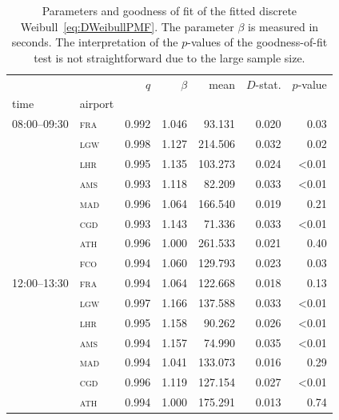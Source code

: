 \documentclass[draft,review]{elsarticle}
\newcommand{\airp}[1]{\textcolor{#1}{\textsc{#1}}}
\begin{document}
\begin{table}
    \centering
    \caption{Parameters and goodness of fit of the fitted discrete Weibull~\eqref{eq:DWeibullPMF}. The parameter \(\beta\) is measured in seconds. The interpretation of the \(p\)-values of the goodness-of-fit test is not straightforward due to the large sample size.}
    \label{tab:fitted}
    \begin{tabular}{llrrrrr}
      \toprule
                   &             &   \(q\) & \(\beta\) &    mean & \(D\)-stat. & \(p\)-value \\
      time & airport &       &         &         &           &           \\
      \midrule
      08:00--09:30 & \airp{fra} & 0.992 &   1.046 &  93.131 &     0.020 &      0.03 \\
                   & \airp{lgw} & 0.998 &   1.127 & 214.506 &     0.032 &      0.02 \\
                   & \airp{lhr} & 0.995 &   1.135 & 103.273 &     0.024 &     <0.01 \\
                   & \airp{ams} & 0.993 &   1.118 &  82.209 &     0.033 &     <0.01 \\
                   & \airp{mad} & 0.996 &   1.064 & 166.540 &     0.019 &      0.21 \\
                   & \airp{cgd} & 0.993 &   1.143 &  71.336 &     0.033 &     <0.01 \\
                   & \airp{ath} & 0.996 &   1.000 & 261.533 &     0.021 &      0.40 \\
                   & \airp{fco} & 0.994 &   1.060 & 129.793 &     0.023 &      0.03 \\
      12:00--13:30 & \airp{fra} & 0.994 &   1.064 & 122.668 &     0.018 &      0.13 \\
                   & \airp{lgw} & 0.997 &   1.166 & 137.588 &     0.033 &     <0.01 \\
                   & \airp{lhr} & 0.995 &   1.158 &  90.262 &     0.026 &     <0.01 \\
                   & \airp{ams} & 0.994 &   1.157 &  74.990 &     0.035 &     <0.01 \\
                   & \airp{mad} & 0.994 &   1.041 & 133.073 &     0.016 &      0.29 \\
                   & \airp{cgd} & 0.996 &   1.119 & 127.154 &     0.027 &     <0.01 \\
                   & \airp{ath} & 0.994 &   1.000 & 175.291 &     0.013 &      0.74 \\

\end{tabular}
\end{table}
\end{document}

